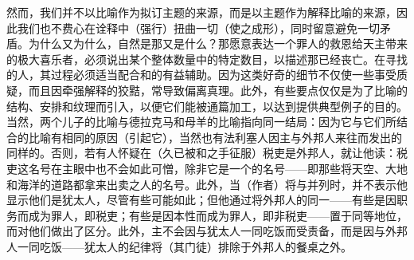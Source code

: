 然而，我们并不以比喻作为拟订主题的来源，而是以主题作为解释比喻的来源，因此我们也不费心在诠释中（强行）扭曲一切（使之成形），同时留意避免一切矛盾。为什么又为什么，自然是那又是什么？那愿意表达一个罪人的救恩给天主带来的极大喜乐者，必须说出某个整体数量中的特定数目，以描述那已经丧亡。在寻找的人，其过程必须适当配合和的有益辅助。因为这类好奇的细节不仅使一些事受质疑，而且因牵强解释的狡黠，常导致偏离真理。此外，有些要点仅仅是为了比喻的结构、安排和纹理而引入，以便它们能被通篇加工，以达到提供典型例子的目的。当然，两个儿子的比喻与德拉克马和母羊的比喻指向同一结局：因为它与它们所结合的比喻有相同的原因（引起它），当然也有法利塞人因主与外邦人来往而发出的同样的。否则，若有人怀疑在（久已被和之手征服）税吏是外邦人，就让他读：税吏这名号在主眼中也不会如此可憎，除非它是一个的名号——即那些将天空、大地和海洋的道路都拿来出卖之人的名号。此外，当（作者）将与并列时，并不表示他显示他们是犹太人，尽管有些可能如此；但他通过将外邦人的同一——有些是因职务而成为罪人，即税吏；有些是因本性而成为罪人，即非税吏——置于同等地位，而对他们做出了区分。此外，主不会因与犹太人一同吃饭而受责备，而是因与外邦人一同吃饭——犹太人的纪律将（其门徒）排除于外邦人的餐桌之外。\par

